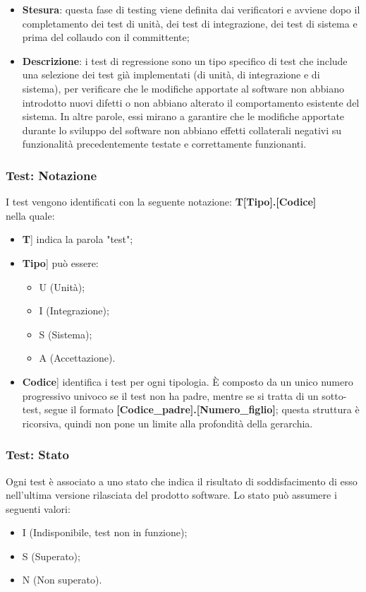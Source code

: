 \documentclass[10pt, a4paper]{article}
\begin{document}
\begin{itemize}
    \item \textbf{Stesura}: questa fase di testing viene definita dai verificatori e avviene dopo il completamento dei test di unità, dei test di integrazione, dei test di sistema e prima del collaudo con il committente;
    \item \textbf{Descrizione}: i test di regressione sono un tipo specifico di test che include una selezione dei test già implementati (di unità, di integrazione e di sistema), per verificare che le modifiche apportate al software non abbiano introdotto nuovi difetti o non abbiano alterato il comportamento esistente del sistema. In altre parole, essi mirano a garantire che le modifiche apportate durante lo sviluppo del software non abbiano effetti collaterali negativi su funzionalità precedentemente testate e correttamente funzionanti.
\end{itemize}



\subsubsection{Test: Notazione}
I test vengono identificati con la seguente notazione:
\textbf{T[Tipo].[Codice]}\\
nella quale:
\begin{itemize}
\item \lbrack \textbf{T}] indica la parola "test";
\item \lbrack \textbf{Tipo}] può essere:
    \begin{itemize}
	    \item U (Unità);
	    \item I (Integrazione);
	    \item S (Sistema);
        \item A (Accettazione).
    \end{itemize}
\item \lbrack \textbf{Codice}] identifica i test per ogni tipologia. È composto da un unico numero progressivo univoco se il test non ha padre, mentre se si tratta di un sotto-test, segue il formato \textbf{[Codice\_padre].[Numero\_figlio]}; questa struttura è ricorsiva, quindi non pone un limite alla profondità della gerarchia.
\end{itemize}

\subsubsection{Test: Stato}
Ogni test è associato a uno stato che indica il risultato di soddisfacimento di esso nell'ultima versione rilasciata del prodotto software. Lo stato può assumere i seguenti valori:
\begin{itemize}
    \item I (Indisponibile, test non in funzione);
    \item S (Superato);
    \item N (Non superato).
\end{itemize}
\end{document}
